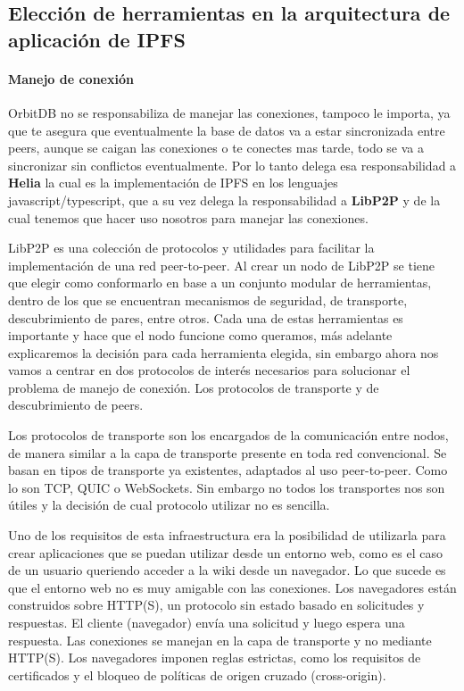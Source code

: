 \subsection{Elección de herramientas en la arquitectura de aplicación de IPFS}

\paragraph{Manejo de conexión}
OrbitDB no se responsabiliza de manejar las conexiones, tampoco le importa, ya que te asegura que eventualmente la base de datos va a estar sincronizada entre peers, aunque se caigan las conexiones o te conectes mas tarde, todo se va a sincronizar sin conflictos eventualmente. Por lo tanto delega esa responsabilidad a \textbf{Helia} \cite{helia} la cual es la implementación de IPFS en los lenguajes javascript/typescript, que a su vez delega la responsabilidad a \textbf{LibP2P} \cite{libp2p} y de la cual tenemos que hacer uso nosotros para manejar las conexiones.

LibP2P es una colección de protocolos y utilidades para facilitar la implementación de una red peer-to-peer. Al crear un nodo de LibP2P se tiene que elegir como conformarlo en base a un conjunto modular de herramientas, dentro de los que se encuentran mecanismos de seguridad, de transporte, descubrimiento de pares, entre otros. Cada una de estas herramientas es importante y hace que el nodo funcione como queramos, más adelante explicaremos la decisión para cada herramienta elegida, sin embargo ahora nos vamos a centrar en dos protocolos de interés necesarios para solucionar el problema de manejo de conexión. Los protocolos de transporte y de descubrimiento de peers.

Los protocolos de transporte son los encargados de la comunicación entre nodos, de manera similar a la capa de transporte presente en toda red convencional. Se basan en tipos de transporte ya existentes, adaptados al uso peer-to-peer. Como lo son TCP, QUIC o WebSockets. Sin embargo no todos los transportes nos son útiles y la decisión de cual protocolo utilizar no es sencilla.

Uno de los requisitos de esta infraestructura era la posibilidad de utilizarla para crear aplicaciones que se puedan utilizar desde un entorno web, como es el caso de un usuario queriendo acceder a la wiki desde un navegador. Lo que sucede es que el entorno web no es muy amigable con las conexiones. Los navegadores están construidos sobre HTTP(S), un protocolo sin estado basado en solicitudes y respuestas. El cliente (navegador) envía una solicitud y luego espera una respuesta. Las conexiones se manejan en la capa de transporte y no mediante HTTP(S). Los navegadores imponen reglas estrictas, como los requisitos de certificados y el bloqueo de políticas de origen cruzado (cross-origin).

